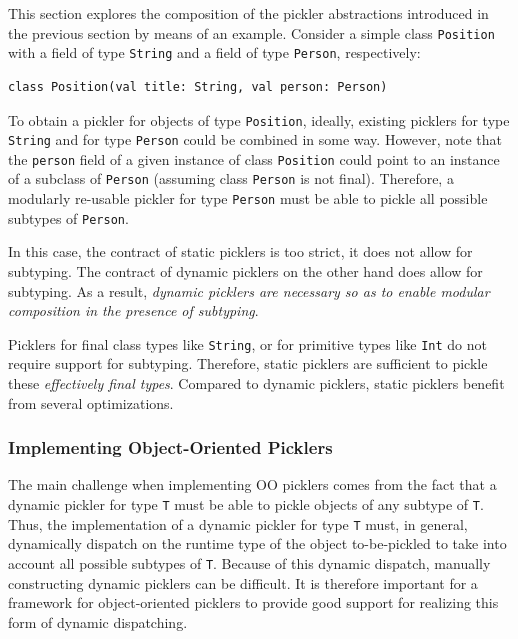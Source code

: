 \documentclass[10pt]{sigplanconf}
\theoremstyle{definition}
\theoremstyle{definition}
\newcommand{\term}[1]{\mbox{\texttt{#1}}}
\begin{document}


This section explores the composition of the pickler abstractions introduced
in the previous section by means of an example. Consider a simple class
\verb|Position| with a field of type \verb|String| and a field of type \term{Person},
respectively:

\begin{lstlisting}
class Position(val title: String, val person: Person)
\end{lstlisting}

To obtain a pickler for objects of type \verb|Position|, ideally, existing
picklers for type \verb|String| and for type \verb|Person| could be combined
in some way. However, note that the \verb|person| field of a given instance of
class \verb|Position| could point to an instance of a subclass of
\verb|Person| (assuming class \verb|Person| is not final). Therefore, a
modularly re-usable pickler for type \verb|Person| must be able to pickle all
possible subtypes of \verb|Person|.

In this case, the contract of static picklers is too strict, it does not allow
for subtyping. The contract of dynamic picklers on the other hand does allow
for subtyping. As a result, {\em dynamic picklers are necessary so as to enable
modular composition in the presence of subtyping}.

Picklers for final class types like \term{String}, or for primitive types like
\term{Int} do not require support for subtyping. Therefore, static picklers
are sufficient to pickle these {\em effectively final types}. Compared to
dynamic picklers, static picklers benefit from several optimizations.


\subsubsection{Implementing Object-Oriented Picklers}

The main challenge when implementing OO picklers comes from the fact that a
dynamic pickler for type \verb|T| must be able to pickle objects of any subtype of
\verb|T|. Thus, the implementation of a dynamic pickler for type \verb|T| must, in
general, dynamically dispatch on the runtime type of the object to-be-pickled
to take into account all possible subtypes of \verb|T|. Because of this dynamic
dispatch, manually constructing dynamic picklers can be difficult. It is
therefore important for a framework for object-oriented picklers to provide
good support for realizing this form of dynamic dispatching.
\end{document}
